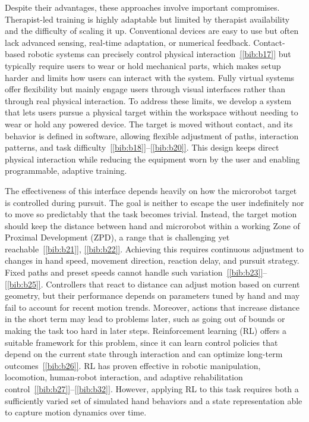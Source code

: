 \documentclass[journal,twoside,web]{ieeecolor2}
\newcommand{\citelink}[1]{\hyperref[bib:#1]{[\ref*{bib:#1}]}}
\newcommand{\citerange}[2]{\citelink{#1}--\citelink{#2}}
\begin{document}
Despite their advantages, these approaches involve important compromises. Therapist-led training is highly adaptable but limited by therapist availability and the difficulty of scaling it up. Conventional devices are easy to use but often lack advanced sensing, real-time adaptation, or numerical feedback. Contact-based robotic systems can precisely control physical interaction~\citelink{b17} but typically require users to wear or hold mechanical parts, which makes setup harder and limits how users can interact with the system. Fully virtual systems offer flexibility but mainly engage users through visual interfaces rather than through real physical interaction. To address these limits, we develop a system that lets users pursue a physical target within the workspace without needing to wear or hold any powered device. The target is moved without contact, and its behavior is defined in software, allowing flexible adjustment of paths, interaction patterns, and task difficulty~\citerange{b18}{b20}. This design keeps direct physical interaction while reducing the equipment worn by the user and enabling programmable, adaptive training.

The effectiveness of this interface depends heavily on how the microrobot target is controlled during pursuit. The goal is neither to escape the user indefinitely nor to move so predictably that the task becomes trivial. Instead, the target motion should keep the distance between hand and microrobot within a working Zone of Proximal Development (ZPD), a range that is challenging yet reachable~\citelink{b21}, \citelink{b22}. Achieving this requires continuous adjustment to changes in hand speed, movement direction, reaction delay, and pursuit strategy. Fixed paths and preset speeds cannot handle such variation~\citerange{b23}{b25}. Controllers that react to distance can adjust motion based on current geometry, but their performance depends on parameters tuned by hand and may fail to account for recent motion trends. Moreover, actions that increase distance in the short term may lead to problems later, such as going out of bounds or making the task too hard in later steps. Reinforcement learning (RL) offers a suitable framework for this problem, since it can learn control policies that depend on the current state through interaction and can optimize long-term outcomes~\citelink{b26}. RL has proven effective in robotic manipulation, locomotion, human-robot interaction, and adaptive rehabilitation control~\citerange{b27}{b32}. However, applying RL to this task requires both a sufficiently varied set of simulated hand behaviors and a state representation able to capture motion dynamics over time.
\end{document}
